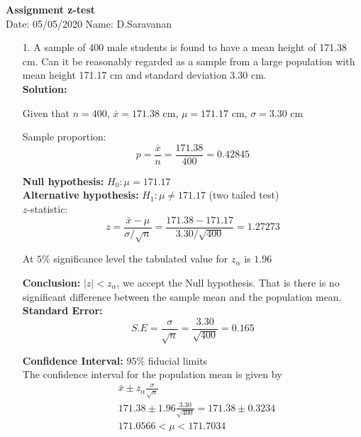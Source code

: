 \documentclass[a4paper,10pt,openright]{report}
\begin{document}
\singlespacing
\pagestyle{plain}

\begin{center}
\textbf{Assignment z-test} \\
Date: 05/05/2020 \hspace{2mm} Name: D.Saravanan
\end{center}

\vspace{10px}

\begin{enumerate}

\item[1.] A sample of 400 male students is found to have a mean height of 171.38 cm. Can it
be reasonably regarded as a sample from a large population with mean height 171.17 cm and
standard deviation 3.30 cm. \\

\textbf{Solution:}

Given that $n = 400$, $\bar x = 171.38$ cm, $\mu = 171.17$ cm, $\sigma = 3.30$ cm

Sample proportion:
\begin{equation*}
p = \frac{\bar x}{n} = \frac{171.38}{400} = 0.42845
\end{equation*}

\textbf{Null hypothesis:} $H_{0}: \mu = 171.17$ \\
\textbf{Alternative hypothesis:} $H_{1}: \mu \neq 171.17$ \hspace{5px} (two tailed test) \\

$z$-statistic:
\begin{equation*}
z = \frac{\bar x - \mu}{\sigma/\sqrt{n}}
  = \frac{171.38 - 171.17}{3.30/\sqrt{400}}
  = 1.27273
\end{equation*}

At $5\%$ significance level the tabulated value for $z_{\alpha}$ is $1.96$ 

\textbf{Conclusion:} $|z| < z_{\alpha}$, we accept the Null hypothesis. That is there is no
significant difference between the sample mean and the population mean. \\

\textbf{Standard Error:}
\begin{equation*}
S.E = \frac{\sigma}{\sqrt{n}} = \frac{3.30}{\sqrt{400}} = 0.165
\end{equation*}

\textbf{Confidence Interval:} $95\%$ fiducial limits \\
The confidence interval for the population mean is given by 
\begin{equation*}
\begin{split}
&\bar x \pm z_{\alpha} \frac{\sigma}{\sqrt{n}} \\
&171.38 \pm 1.96 \frac{3.30}{\sqrt{400}} = 171.38 \pm 0.3234 \\
&171.0566 < \mu < 171.7034
\end{split}
\end{equation*}


\end{enumerate}
\end{document}
